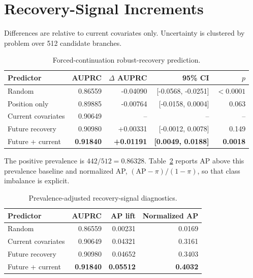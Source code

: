 \documentclass[10pt,letterpaper]{article}
\newcommand{\best}[1]{\textbf{#1}}
\begin{document}
\section{Recovery-Signal Increments}

Differences are relative to current covariates only. Uncertainty is clustered
by problem over 512 candidate branches.

\begin{table}[H]
\centering
\small
\setlength{\tabcolsep}{5pt}
\begin{tabular}{lrrrr}
\toprule
Predictor & AUPRC & $\Delta$ AUPRC & 95\% CI & $p$ \\
\midrule
Random & 0.86559 & -0.04090 & [-0.0568, -0.0251] & $<0.0001$ \\
Position only & 0.89885 & -0.00764 & [-0.0158, 0.0004] & 0.063 \\
Current covariates & 0.90649 & -- & -- & -- \\
Future recovery & 0.90980 & +0.00331 & [-0.0012, 0.0078] & 0.149 \\
Future + current & \best{0.91840} & \best{+0.01191} &
\best{[0.0049, 0.0188]} & \best{0.0018} \\
\bottomrule
\end{tabular}
\caption{Forced-continuation robust-recovery prediction.}
\label{tab:supp-signal}
\end{table}

The positive prevalence is $442/512=0.86328$. Table~\ref{tab:supp-ap-lift}
reports AP above this prevalence baseline and normalized AP,
$(\mathrm{AP}-\pi)/(1-\pi)$, so that class imbalance is explicit.

\begin{table}[H]
\centering
\small
\begin{tabular}{lrrr}
\toprule
Predictor & AUPRC & AP lift & Normalized AP \\
\midrule
Random & 0.86559 & 0.00231 & 0.0169 \\
Current covariates & 0.90649 & 0.04321 & 0.3161 \\
Future recovery & 0.90980 & 0.04652 & 0.3403 \\
Future + current & \best{0.91840} & \best{0.05512} & \best{0.4032} \\
\bottomrule
\end{tabular}
\caption{Prevalence-adjusted recovery-signal diagnostics.}
\label{tab:supp-ap-lift}
\end{table}
\end{document}
